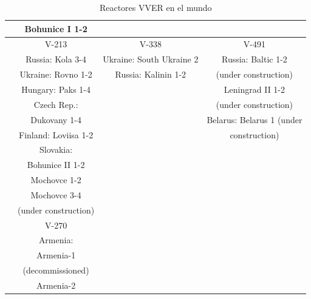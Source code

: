 \documentclass[]{article}
\begin{document}
\begin{table}[h!]
\begin{tabular}{||c|c|c|c||}
		& Bohunice I 1-2       &                          &                             \\ \hline
		& V-213                & V-338                    & V-491                       \\
		& Russia: Kola 3-4     & Ukraine: South Ukraine 2 & Russia: Baltic 1-2          \\
		& Ukraine: Rovno 1-2   & Russia: Kalinin 1-2      & (under construction)        \\
		& Hungary: Paks 1-4    &                          & Leningrad II 1-2            \\
		& Czech Rep.:          &                          & (under construction)        \\
		& Dukovany 1-4         &                          & Belarus: Belarus 1 (under   \\
		& Finland: Loviisa 1-2 &                          & construction)               \\
		& Slovakia:            &                          &                             \\
		& Bohunice II 1-2      &                          &                             \\
		& Mochovce 1-2         &                          &                             \\
		& Mochovce 3-4         &                          &                             \\
		& (under construction) &                          &                             \\ \hline
		& V-270                &                          &                             \\
		& Armenia:             &                          &                             \\
		& Armenia-1            &                          &                             \\
		& (decommissioned)     &                          &                             \\
		& Armenia-2            &                          &                             \\ \hline
	\end{tabular}
  \caption{Reactores VVER en el mundo}
  \label{ReactoresVVERMundo}
\end{table}
\end{document}
